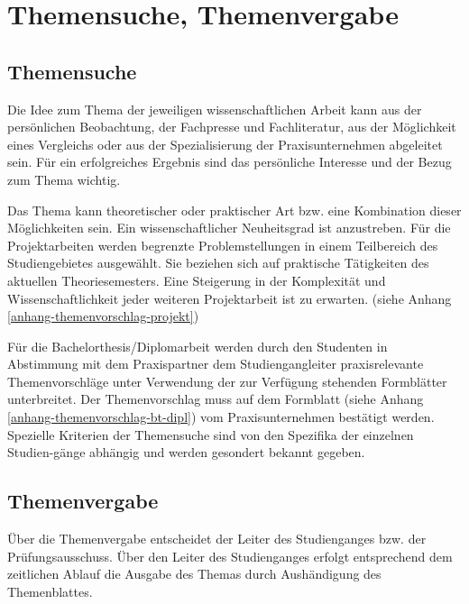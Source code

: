 \chapter{Themensuche, Themenvergabe}
\label{themensuche-vergabe}
\section{Themensuche}
\label{themensuche}
Die Idee zum Thema der jeweiligen wissenschaftlichen Arbeit kann aus der persönlichen Beobachtung, der Fachpresse und Fachliteratur, aus der Möglichkeit eines Vergleichs oder aus der Spezialisierung der Praxisunternehmen abgeleitet sein.
Für ein erfolgreiches Ergebnis sind das persönliche Interesse und der Bezug zum Thema wichtig.

Das Thema kann theoretischer oder praktischer Art bzw. eine Kombination dieser Möglichkeiten sein.
Ein wissenschaftlicher Neuheitsgrad ist anzustreben.
Für die Projektarbeiten werden begrenzte Problemstellungen in einem Teilbereich des Studiengebietes ausgewählt.
Sie beziehen sich auf praktische Tätigkeiten des aktuellen Theoriesemesters.
Eine Steigerung in der Komplexität und Wissenschaftlichkeit jeder weiteren Projektarbeit ist zu erwarten. (siehe Anhang \ref{anhang-themenvorschlag-projekt})

Für die Bachelorthesis/Diplomarbeit werden durch den Studenten in Abstimmung mit dem Praxispartner dem Studiengangleiter praxisrelevante Themenvorschläge unter Verwendung der zur Verfügung stehenden Formblätter unterbreitet.
Der Themenvorschlag muss auf dem Formblatt (siehe Anhang \ref{anhang-themenvorschlag-bt-dipl}) vom Praxisunternehmen bestätigt werden.
Spezielle Kriterien der Themensuche sind von den Spezifika der einzelnen Studien-gänge abhängig und werden gesondert bekannt gegeben.


\section{Themenvergabe}
\label{themenvergabe}
Über die Themenvergabe entscheidet der Leiter des Studienganges bzw. der Prüfungsausschuss.
Über den Leiter des Studienganges erfolgt entsprechend dem zeitlichen Ablauf die Ausgabe des Themas durch Aushändigung des Themenblattes.
